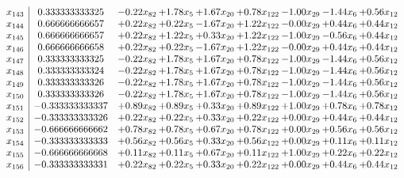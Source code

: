 \documentclass[8pt]{article}
\begin{document}
\[\begin{array}{c| c c@{\hskip 2pt} c@{\hskip 2pt} c@{\hskip 2pt} c@{\hskip 2pt} c@{\hskip 2pt} c@{\hskip 2pt} c@{\hskip 2pt} }
 x_{143}   &  0.333333333325 & -0.22 x_{82} & +  1.78 x_{5} & +  1.67 x_{20} & +  0.78 x_{122} & -1.00 x_{29} & -1.44 x_{6} & +  0.56 x_{12}\\
 x_{144}   &  0.666666666657 & +  0.22 x_{82} & +  0.22 x_{5} & -1.67 x_{20} & +  1.22 x_{122} & -0.00 x_{29} & +  0.44 x_{6} & +  0.44 x_{12}\\
 x_{145}   &  0.666666666657 & +  0.22 x_{82} & +  1.22 x_{5} & +  0.33 x_{20} & +  1.22 x_{122} & -1.00 x_{29} & -0.56 x_{6} & +  0.44 x_{12}\\
 x_{146}   &  0.666666666658 & +  0.22 x_{82} & +  0.22 x_{5} & -1.67 x_{20} & +  1.22 x_{122} & -0.00 x_{29} & +  0.44 x_{6} & +  0.44 x_{12}\\
 x_{147}   &  0.333333333325 & -0.22 x_{82} & +  1.78 x_{5} & +  1.67 x_{20} & +  0.78 x_{122} & -1.00 x_{29} & -1.44 x_{6} & +  0.56 x_{12}\\
 x_{148}   &  0.333333333324 & -0.22 x_{82} & +  1.78 x_{5} & +  1.67 x_{20} & +  0.78 x_{122} & -1.00 x_{29} & -1.44 x_{6} & +  0.56 x_{12}\\
 x_{149}   &  0.333333333326 & -0.22 x_{82} & +  1.78 x_{5} & +  1.67 x_{20} & +  0.78 x_{122} & -1.00 x_{29} & -1.44 x_{6} & +  0.56 x_{12}\\
 x_{150}   &  0.333333333326 & -0.22 x_{82} & +  1.78 x_{5} & +  1.67 x_{20} & +  0.78 x_{122} & -1.00 x_{29} & -1.44 x_{6} & +  0.56 x_{12}\\
 x_{151}   &  -0.333333333337 & +  0.89 x_{82} & +  0.89 x_{5} & +  0.33 x_{20} & +  0.89 x_{122} & +  1.00 x_{29} & +  0.78 x_{6} & +  0.78 x_{12}\\
 x_{152}   &  -0.333333333326 & +  0.22 x_{82} & +  0.22 x_{5} & +  0.33 x_{20} & +  0.22 x_{122} & +  0.00 x_{29} & +  0.44 x_{6} & +  0.44 x_{12}\\
 x_{153}   &  -0.666666666662 & +  0.78 x_{82} & +  0.78 x_{5} & +  0.67 x_{20} & +  0.78 x_{122} & +  0.00 x_{29} & +  0.56 x_{6} & +  0.56 x_{12}\\
 x_{154}   &  -0.333333333333 & +  0.56 x_{82} & +  0.56 x_{5} & +  0.33 x_{20} & +  0.56 x_{122} & +  0.00 x_{29} & +  0.11 x_{6} & +  0.11 x_{12}\\
 x_{155}   &  -0.666666666668 & +  0.11 x_{82} & +  0.11 x_{5} & +  0.67 x_{20} & +  0.11 x_{122} & +  1.00 x_{29} & +  0.22 x_{6} & +  0.22 x_{12}\\
 x_{156}   &  -0.333333333331 & +  0.22 x_{82} & +  0.22 x_{5} & +  0.33 x_{20} & +  0.22 x_{122} & +  0.00 x_{29} & +  0.44 x_{6} & +  0.44 x_{12}\\

\end{array}\]
\end{document}
